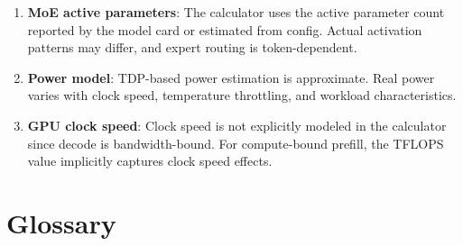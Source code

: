 \documentclass[11pt,a4paper]{article}
\theoremstyle{definition}
\begin{document}
\begin{enumerate}
  \item \textbf{MoE active parameters}: The calculator uses the active parameter count reported by the model card or estimated from config. Actual activation patterns may differ, and expert routing is token-dependent.
  \item \textbf{Power model}: TDP-based power estimation is approximate. Real power varies with clock speed, temperature throttling, and workload characteristics.
  \item \textbf{GPU clock speed}: Clock speed is not explicitly modeled in the calculator since decode is bandwidth-bound. For compute-bound prefill, the TFLOPS value implicitly captures clock speed effects.
\end{enumerate}

\section{Glossary}
\end{document}
